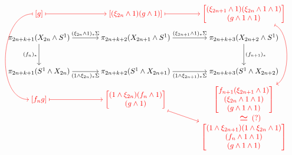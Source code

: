 \begingroup
\everydisplay{\displaywidth=\dimexpr\linewidth+18mm\relax \displayindent=-9mm\relax}
\[
\begin{tikzcd}[cramped,column sep=large,row sep=small]
	{\color{red}[g]}
		\arrow[r,red,maps to]
		\arrow[ddd,red,maps to,out=180,in=180,looseness=1]
	&
	{\color{red}\left[(\xi_{2n}\wedge1) (g\wedge1)\right]}
		\arrow[r,red,maps to]
	&
	{\color{red}\left[
		\begin{gathered}
			(\xi_{2n+1}\wedge1) (\xi_{2n}\wedge1\wedge1)\\[-.3em]
			{} (g\wedge1\wedge1)
		\end{gathered}
	\right]}
		\arrow[ddd,red,maps to,out=-20,in=25,looseness=0.7]
	\\
	\pi_{2n+k+1}(X_{2n}\wedge S^1)
		\arrow[r,"(\xi_{2n}\wedge1)_* \Sigma"]
		\arrow[d,"(f_n)_*"']
	&
	\pi_{2n+k+2}(X_{2n+1}\wedge S^1)
		\arrow[r,"(\xi_{2n+1}\wedge1)_* \Sigma"]
	&
	\pi_{2n+k+3}(X_{2n+2}\wedge S^1)
		\arrow[d,"(f_{n+1})_*"]
	\\[2em]
	\pi_{2n+k+1}(S^1\wedge X_{2n})
		\arrow[r,"(1\wedge\xi_{2n})_* \Sigma"']
	&
	\pi_{2n+k+2}(S^1\wedge X_{2n+1})
		\arrow[r,"(1\wedge\xi_{2n+1})_* \Sigma"']
	&
	\pi_{2n+k+3}(S^1\wedge X_{2n+2})
	\\
	{\color{red}[f_n  g]}
		\arrow[r,red,maps to]
	&
	{\color{red}\left[
		\begin{gathered}
			(1\wedge\xi_{2n}) (f_n\wedge1)\\[-.3em]
			{} (g\wedge1)
		\end{gathered}
	\right]}
		\arrow[dr,red,maps to]
	&
	{\color{red}\left[
		\begin{gathered}
			f_{n+1} (\xi_{2n+1}\wedge1)\\[-.3em]
			{} (\xi_{2n}\wedge1\wedge1)\\[-.3em]
			{} (g\wedge1\wedge1)
		\end{gathered}
	\right]}
        \arrow[d, red, phantom, "\simeq"{description, font=\Large}, "\;\;\;(?)"{right}]
	\\
	& &
	{\color{red}\left[
		\begin{gathered}
			(1\wedge\xi_{2n+1}) (1\wedge\xi_{2n}\wedge1)\\[-.3em]
			{} (f_n\wedge1\wedge1)\\[-.3em]
			{} (g\wedge1\wedge1)
		\end{gathered}
	\right]}
\end{tikzcd}
\]
\endgroup